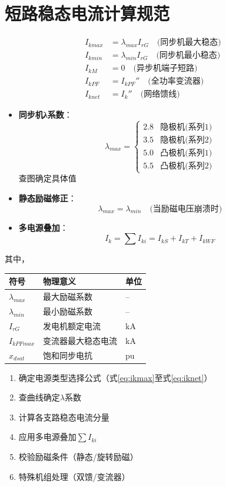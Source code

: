 \documentclass[a4paper,11pt,AutoFakeBold]{ctexart}
\begin{document}
\newpage
\section{短路稳态电流计算规范}

\begin{align}
I_{kmax} &= \lambda_{max}I_{rG} \quad \text{(同步机最大稳态)} \label{eq:ikmax} \\
I_{kmin} &= \lambda_{min}I_{rG} \quad \text{(同步机最小稳态)} \label{eq:ikmin} \\
I_{kM} &= 0 \quad \text{(异步机端子短路)} \label{eq:ikm} \\
I_{kPF} &= I_{kPF} ''\quad \text{(全功率变流器)} \label{eq:ikpf} \\
I_{knet} &= I_k'' \quad \text{(网络馈线)} \label{eq:iknet}
\end{align}


\begin{itemize}
\item \textbf{同步机λ系数}：
  \[
  \lambda_{max} = 
  \begin{cases}
  2.8 & \text{隐极机(系列1)} \\
  3.5 & \text{隐极机(系列2)} \\
  5.0 & \text{凸极机(系列1)} \\
  5.5 & \text{凸极机(系列2)}
  \end{cases}
  \]
  查图确定具体值

\item \textbf{静态励磁修正}：
  \[
  \lambda_{max} = \lambda_{min} \quad \text{(当励磁电压崩溃时)}
  \]

\item \textbf{多电源叠加}：
  \[
  I_k = \sum I_{ki} = I_{kS} + I_{kT} + I_{kWF}
  \]
\end{itemize}

其中，

\begin{tabular}{lll}
符号 & 物理意义 & 单位 \\
\hline
$\lambda_{max}$ & 最大励磁系数 & -- \\
$\lambda_{min}$ & 最小励磁系数 & -- \\
$I_{rG}$ & 发电机额定电流 & \si{kA} \\
$I_{kPFmax}$ & 变流器最大稳态电流 & \si{kA} \\
$x_{dsat}$ & 饱和同步电抗 & \si{pu} \\
\end{tabular}

\begin{enumerate}
\item 确定电源类型选择公式（式\ref{eq:ikmax}至式\ref{eq:iknet}）
\item 查曲线确定$\lambda$系数
\item 计算各支路稳态电流分量
\item 应用多电源叠加$\sum I_{ki}$
\item 校验励磁条件（静态/旋转励磁）
\item 特殊机组处理（双馈/变流器）
\end{enumerate}
\end{document}
